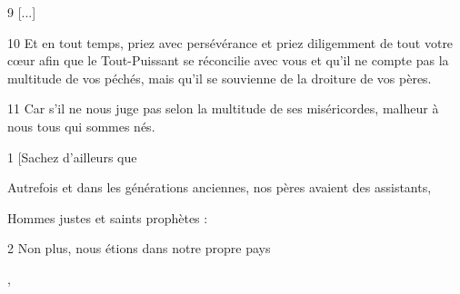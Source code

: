 \par 9 [...]

\par 10 Et en tout temps, priez avec persévérance et priez diligemment de tout votre cœur afin que le Tout-Puissant se réconcilie avec vous et qu'il ne compte pas la multitude de vos péchés, mais qu'il se souvienne de la droiture de vos pères.

\par 11 Car s'il ne nous juge pas selon la multitude de ses miséricordes, malheur à nous tous qui sommes nés.


\par 1 [Sachez d'ailleurs que

\par Autrefois et dans les générations anciennes, nos pères avaient des assistants,

\par Hommes justes et saints prophètes :

\par 2 Non plus, nous étions dans notre propre pays

\par [Et ils nous ont aidés quand nous avons péché],

